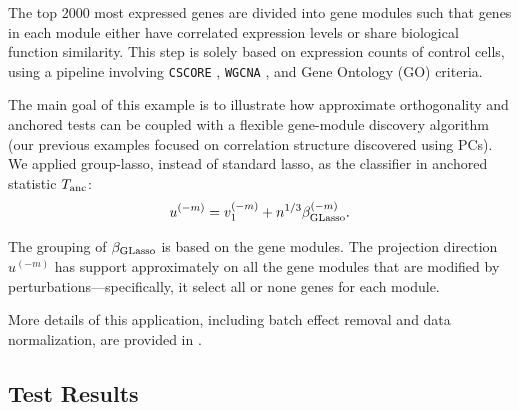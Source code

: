 \documentclass[11pt]{article}
\begin{document}

The top 2000 most expressed genes are divided into gene modules such that genes in each module either have correlated expression levels or share biological function similarity. This step is solely based on expression counts of control cells, using a pipeline involving \texttt{CSCORE} \cite{su2023cell}, \texttt{WGCNA} \cite{langfelder2008wgcna}, and Gene Ontology (GO) criteria. 

The main goal of this example is to illustrate how approximate orthogonality and anchored tests can be coupled with a flexible gene-module discovery algorithm (our previous examples focused on correlation structure discovered using PCs). We applied group-lasso, instead of standard lasso, as the classifier in anchored statistic $T_{\rm anc}$:
\begin{equation*}
    u^{(-m)} = v_1^{(-m)} + n^{1/3} \beta^{(-m)}_{\rm GLasso}.
\end{equation*} 

The grouping of $\beta_{\rm GLasso}$ is based on the gene modules. The projection direction $u^{(-m)}$ has support approximately on all the gene modules that are modified by perturbations---specifically, it select all or none genes for each module. 

More details of this application, including batch effect removal and data normalization, are provided in . 



\subsection{Test Results}
\end{document}
